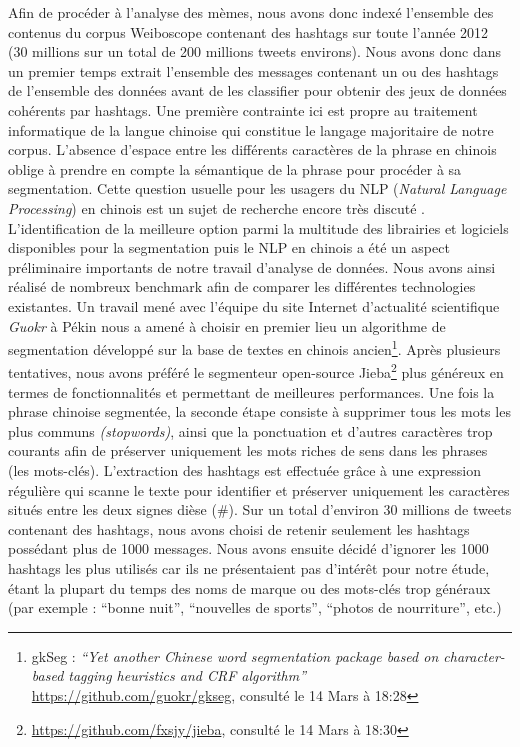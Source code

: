 Afin de proc\'eder \`a l{\textquoteright}analyse des m\`emes, nous avons
donc index\'e l{\textquoteright}ensemble des contenus du corpus
Weiboscope contenant des hashtags sur toute l{\textquoteright}ann\'ee
2012 (30 millions sur un total de 200 millions tweets environs). Nous
avons donc dans un premier temps extrait l{\textquoteright}ensemble des
messages contenant un ou des hashtags de l{\textquoteright}ensemble des
donn\'ees avant de les classifier pour obtenir des jeux de donn\'ees
coh\'erents par hashtags. Une premi\`ere contrainte ici est propre au
traitement informatique de la langue chinoise qui constitue le langage
majoritaire de notre corpus. L{\textquoteright}absence
d{\textquoteright}espace entre les diff\'erents caract\`eres de la
phrase en chinois oblige \`a prendre en compte la s\'emantique de la
phrase pour proc\'eder \`a sa segmentation. Cette question usuelle pour
les usagers du NLP (\textit{Natural Language Processing}) en chinois
est un sujet de recherche encore tr\`es discut\'e \cite{Qiu2013}.
L{\textquoteright}identification de la meilleure option parmi la
multitude des librairies et logiciels disponibles pour la segmentation
puis le NLP en chinois a \'et\'e un aspect pr\'eliminaire importants de
notre travail d{\textquoteright}analyse de donn\'ees. Nous avons ainsi
r\'ealis\'e de nombreux benchmark afin de comparer les diff\'erentes
technologies existantes. Un travail men\'e avec
l{\textquoteright}\'equipe du site Internet
d{\textquoteright}actualit\'e scientifique \textit{Guokr }\`a P\'ekin
nous a amen\'e \`a choisir en premier lieu un algorithme de
segmentation d\'evelopp\'e sur la base de textes en chinois
ancien\footnote{ gkSeg : \textit{{\textquotedblleft}Yet another Chinese
word segmentation package based on character-based tagging heuristics
and CRF algorithm{\textquotedblright}
}\url{https://github.com/guokr/gkseg}, consult\'e le 14 Mars \`a
18:28}. Apr\`es plusieurs tentatives, nous avons pr\'ef\'er\'e le
segmenteur open-source Jieba\footnote{
\url{https://github.com/fxsjy/jieba}, consult\'e le 14 Mars \`a 18:30}
plus g\'en\'ereux en termes de fonctionnalit\'es et permettant de
meilleures performances. Une fois la phrase chinoise segment\'ee, la
seconde \'etape consiste \`a supprimer tous les mots les plus communs
\textit{(stopwords)}, ainsi que la ponctuation et
d{\textquoteright}autres caract\`eres trop courants afin de pr\'eserver
uniquement les mots riches de sens dans les phrases (les mots-cl\'es).
L{\textquoteright}extraction des hashtags est effectu\'ee gr\^ace \`a
une expression r\'eguli\`ere qui scanne le texte pour identifier et
pr\'eserver uniquement les caract\`eres situ\'es entre les deux signes
di\`ese (\#). Sur un total d{\textquoteright}environ 30 millions de
tweets contenant des hashtags, nous avons choisi de retenir seulement
les hashtags poss\'edant plus de 1000 messages. Nous avons ensuite
d\'ecid\'e d{\textquoteright}ignorer les 1000 hashtags les plus
utilis\'es car ils ne pr\'esentaient pas d{\textquoteright}int\'er\^et
pour notre \'etude, \'etant la plupart du temps des noms de marque ou
des mots-cl\'es trop g\'en\'eraux (par exemple :
{\textquotedblleft}bonne nuit{\textquotedblright},
{\textquotedblleft}nouvelles de sports{\textquotedblright},
{\textquotedblleft}photos de nourriture{\textquotedblright}, etc.) 


